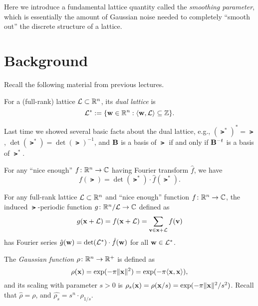 \documentclass[11pt]{article}
\begin{document}
\thispagestyle{fancy}           %



Here we introduce a fundamental lattice quantity called the
\emph{smoothing parameter}, which is essentially the amount of
Gaussian noise needed to completely ``smooth out'' the discrete
structure of a lattice.

\section{Background}
\label{sec:background}

Recall the following material from previous lectures.

\begin{definition}
  For a (full-rank) lattice $\mathcal{L} \subset \mathbb{R}^{n}$, its \emph{dual
    lattice} is
  \[ \mathcal{L}^{*} := \{\mathbf{w} \in \mathbb{R}^{n} : \langle\mathbf{w},\mathcal{L}\rangle \subseteq
      \mathbb{Z}\}. \]
\end{definition}

Last time we showed several basic facts about the dual lattice, e.g.,
$(\lat^{*})^{*} = \lat$, $\det(\lat^{*}) = \det(\lat)^{-1}$, and
$\mathbf{B}$ is a basis of $\lat$ if and only if $\mathbf{B}^{-t}$ is a basis of
$\lat^{*}$.

\begin{lemma}
  \label{lem:psf}
  For any ``nice enough'' $f \colon \mathbb{R}^n \to \mathbb{C}$ having Fourier
  transform $\hat{f}$, we have
  \begin{equation}
    \label{eq:psf}
    f(\lat) = \det(\lat^*)\cdot \hat{f}(\lat^*).
  \end{equation}
\end{lemma}

\begin{lemma}[Periodization]
  \label{lem:periodization}
  For any full-rank lattice $\mathcal{L} \subset \mathbb{R}^{n}$ and ``nice enough''
  function $f \colon \mathbb{R}^{n} \to \mathbb{C}$, the induced $\lat$-periodic
  function $g \colon \mathbb{R}^{n}/\mathcal{L} \to \mathbb{C}$ defined as
  \[ g(\mathbf{x}+\mathcal{L}) = f(\mathbf{x}+\mathcal{L}) = \sum_{\mathbf{v} \in \mathbf{x}+\mathcal{L}}
    f(\mathbf{v}) \] has Fourier series
  $\hat{g}(\mathbf{w}) = \det(\mathcal{L}^{*}) \cdot \hat{f}(\mathbf{w})$ for all
  $\mathbf{w} \in \mathcal{L}^{*}$.
\end{lemma}

The \emph{Gaussian function} $\rho \colon \mathbb{R}^{n} \to \mathbb{R}^{+}$ is
defined as
\begin{equation}
  \label{eq:gaussian}
  \rho(\mathbf{x}) = \exp(-\pi \lVert\mathbf{x}\rVert^{2}) = \exp(-\pi \langle\mathbf{x},
    \mathbf{x}\rangle),
\end{equation}
and its scaling with parameter $s > 0$ is
$\rho_{s}(\mathbf{x}) = \rho(\mathbf{x}/s) = \exp(-\pi
\lVert\mathbf{x}\rVert^{2}/s^{2})$. Recall that $\hat{\rho} = \rho$, and
$\hat{\rho_{s}} = s^{n} \cdot \rho_{1/s}$.
\end{document}
